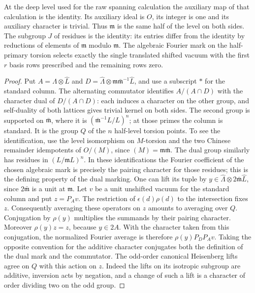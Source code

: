 \begin{corollary}\label{bfam:mark}
At the deep level used for the raw spanning calculation the
auxiliary map of that calculation is the identity. Its auxiliary
ideal is \(O\), its integer is one and its auxiliary character is
trivial. Thus \(\mathfrak m\) is the same half of the level on
both sides. The subgroup \(J\) of residues is the identity:
its entries differ from the identity by reductions of elements
of \(\mathfrak m\) modulo \(\mathfrak m\). The algebraic
Fourier mark on the half-primary torsion selects exactly the
single translated shifted vacuum with the first \(r\) basis
rows prescribed and the remaining rows zero.
\end{corollary}
\begin{proof}
Put \(A=\widehat\Lambda\otimes\widehat L\) and
\(D=\widehat\Lambda\otimes\mathfrak m\bar{\mathfrak m}^{-1}
\widehat L\), and use a subscript \(*\) for the standard column.
The alternating commutator identifies \(A/(A\cap D)\) with
the character dual of \(D/(A\cap D)\): each induces a character
on the other group, and self-duality of both lattices gives
trivial kernel on both sides. The second group is supported on
\(\bar{\mathfrak m}\), where it is
\((\bar{\mathfrak m}^{-1} L/L)^n\); at those primes the column is
standard. It is the group \(Q\) of the \(n\) half-level torsion
points. To see the identification, use the level isomorphism
on \(M\)-torsion and the two Chinese remainder idempotents of
\(O/(M)\), since \((M)=\mathfrak m\bar{\mathfrak m}\).
The dual group similarly has residues in \((L/\mathfrak m L)^n\).
In these identifications the Fourier coefficient of the chosen
algebraic mark is precisely the pairing character for those
residues; this is the defining property of the dual marking.
One can lift its tuple by \(y\in\widehat\Lambda\otimes
2\bar{\mathfrak m}\widehat L\), since \(2\bar{\mathfrak m}\)
is a unit at \(\mathfrak m\). Let \(v\) be a unit unshifted
vacuum for the standard column and put \(z=P_Av\). The restriction
of \(\epsilon(d)\rho(d)\) to the intersection fixes \(z\).
Consequently averaging these operators on \(z\) amounts to averaging
over \(Q\). Conjugation by \(\rho(y)\) multiplies the summands
by their pairing character. Moreover \(\rho(y)z=z\), because
\(y\in2A\). With the character taken from this conjugation, the
normalized Fourier average is therefore \(\rho(y)P_D P_Av\).
Taking the opposite convention for the additive character conjugates
both the definition of the dual mark and the commutator.
The odd-order canonical Heisenberg lifts agree on \(Q\) with this
action on \(z\). Indeed the lifts on its isotropic subgroup are
additive, inversion acts by negation, and a change of such a lift
is a character of order dividing two on the odd group.


\end{proof}
